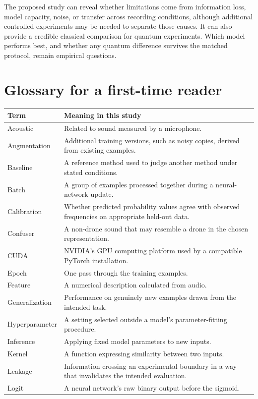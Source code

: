\documentclass[11pt,letterpaper]{article}
\begin{document}
The proposed study can reveal whether limitations come from information loss,
model capacity, noise, or transfer across recording conditions, although
additional controlled experiments may be needed to separate those causes.
It can also provide a credible classical comparison for quantum experiments.
Which model performs best, and whether any quantum difference survives the
matched protocol, remain empirical questions.

\appendix
\section{Glossary for a first-time reader}
\label{sec:glossary}
\begin{longtable}{@{}p{3.1cm}p{13.0cm}@{}}
\toprule
Term & Meaning in this study \\
\midrule
\endhead
Acoustic & Related to sound measured by a microphone. \\
Augmentation & Additional training versions, such as noisy copies, derived from existing examples. \\
Baseline & A reference method used to judge another method under stated conditions. \\
Batch & A group of examples processed together during a neural-network update. \\
Calibration & Whether predicted probability values agree with observed frequencies on appropriate held-out data. \\
Confuser & A non-drone sound that may resemble a drone in the chosen representation. \\
CUDA & NVIDIA's GPU computing platform used by a compatible PyTorch installation. \\
Epoch & One pass through the training examples. \\
Feature & A numerical description calculated from audio. \\
Generalization & Performance on genuinely new examples drawn from the intended task. \\
Hyperparameter & A setting selected outside a model's parameter-fitting procedure. \\
Inference & Applying fixed model parameters to new inputs. \\
Kernel & A function expressing similarity between two inputs. \\
Leakage & Information crossing an experimental boundary in a way that invalidates the intended evaluation. \\
Logit & A neural network's raw binary output before the sigmoid. \\

\end{longtable}
\end{document}

